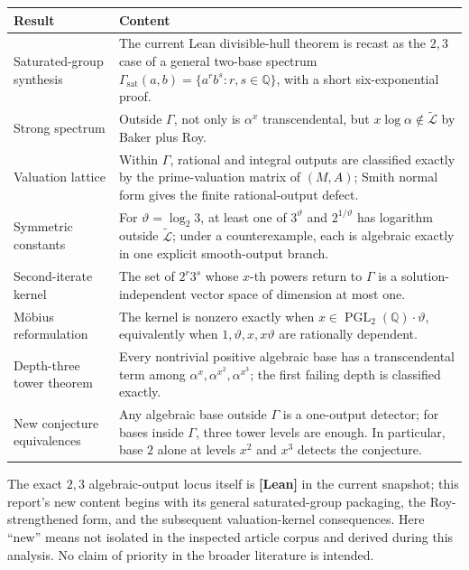 \documentclass[11pt,oneside]{article}
\theoremstyle{definition}
\theoremstyle{remark}
\newcommand{\Q}{\mathbb Q}
\newcommand{\GammaSat}{\Gamma_{\mathrm{sat}}}
\newcommand{\LL}{\widetilde{\mathcal L}}
\newcommand{\PGL}{\operatorname{PGL}}
\newcommand{\statuslean}{\textcolor{LeanBlue}{\textbf{[Lean]}}}
\begin{document}
\begin{longtable}{@{}>{\raggedright\arraybackslash}p{}>{\raggedright\arraybackslash}p{}@{}}
\toprule
Result & Content \\
\midrule
\endhead
Saturated-group synthesis & The current Lean divisible-hull theorem is recast as the
$2,3$ case of a general two-base spectrum
$\GammaSat(a,b)=\{a^rb^s:r,s\in\Q\}$, with a short six-exponential proof. \\
Strong spectrum & Outside $\Gamma$, not only is $\alpha^x$ transcendental, but
$x\log\alpha\notin\LL$ by Baker plus Roy. \\
Valuation lattice & Within $\Gamma$, rational and integral outputs are classified exactly by
the prime-valuation matrix of $(M,A)$; Smith normal form gives the finite rational-output
defect. \\
Symmetric constants & For $\vartheta=\log_2 3$, at least one of
$3^{\vartheta}$ and $2^{1/\vartheta}$ has logarithm outside $\LL$; under a counterexample,
each is algebraic exactly in one explicit smooth-output branch. \\
Second-iterate kernel & The set of $2^r3^s$ whose $x$-th powers return to $\Gamma$ is a
solution-independent vector space of dimension at most one. \\
M\"obius reformulation & The kernel is nonzero exactly when
$x\in\PGL_2(\Q)\cdot\vartheta$, equivalently when $1,\vartheta,x,x\vartheta$ are rationally
dependent. \\
Depth-three tower theorem & Every nontrivial positive algebraic base has a transcendental term
among $\alpha^x,\alpha^{x^2},\alpha^{x^3}$; the first failing depth is classified exactly. \\
New conjecture equivalences & Any algebraic base outside $\Gamma$ is a one-output detector;
for bases inside $\Gamma$, three tower levels are enough.  In particular, base $2$ alone at
levels $x^2$ and $x^3$ detects the conjecture. \\
\bottomrule
\end{longtable}

The exact $2,3$ algebraic-output locus itself is \statuslean{} in the current snapshot;
this report's new content begins with its general saturated-group packaging, the Roy-strengthened
form, and the subsequent valuation-kernel consequences.  Here ``new'' means not isolated in
the inspected article corpus and derived during this analysis.  No claim of priority in the
broader literature is intended.
\end{document}
